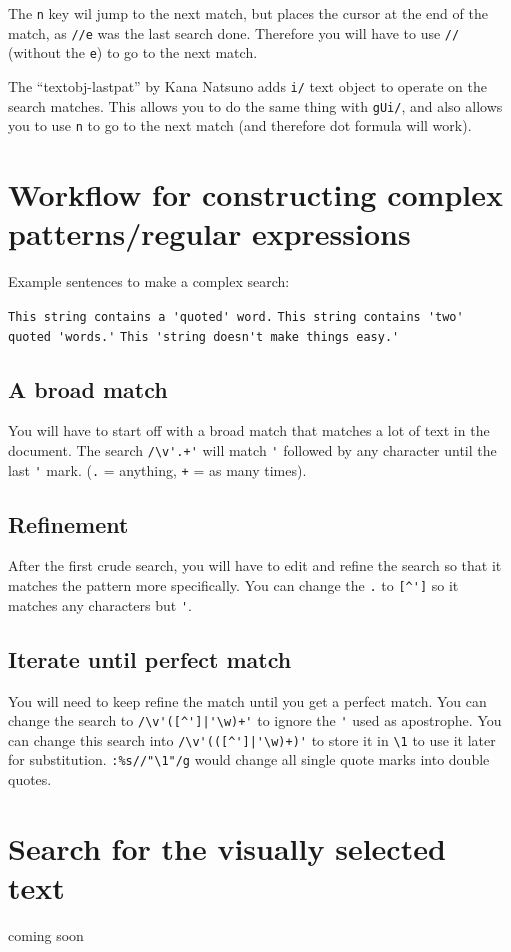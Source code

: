 The \verb|n| key wil jump to the next match, but places the cursor at the end of the match, as \verb|//e| was the last search done.
Therefore you will have to use \verb|//| (without the \verb|e|) to go to the next match.

The ``textobj-lastpat'' by Kana Natsuno adds \verb|i/| text object to operate on the search matches.
This allows you to do the same thing with \verb|gUi/|, and also allows you to use \verb|n| to go to the next match (and therefore dot formula will work).

\section{Workflow for constructing complex patterns/regular expressions}

Example sentences to make a complex search:
\newline

\begin{center}
    \verb|This string contains a 'quoted' word.|
    \verb|This string contains 'two' quoted 'words.'|
    \verb|This 'string doesn't make things easy.'|
\end{center}

\subsection{A broad match}

You will have to start off with a broad match that matches a lot of text in the document.
The search \verb|/\v'.+'| will match \verb|'| followed by any character until the last \verb|'| mark.
(\verb|.| = anything, \verb|+| = as many times).

\subsection{Refinement}

After the first crude search, you will have to edit and refine the search so that it matches the pattern more specifically.
You can change the \verb|.| to \verb|[^']| so it matches any characters but \verb|'|.

\subsection{Iterate until perfect match}

You will need to keep refine the match until you get a perfect match.
You can change the search to \verb-/\v'([^']|'\w)+'- to ignore the \verb|'| used as apostrophe.
You can change this search into \verb-/\v'(([^']|'\w)+)'- to store it in \verb|\1| to use it later for substitution.
\verb|:%s//"\1"/g| would change all single quote marks into double quotes.

\section{Search for the visually selected text}

coming soon
